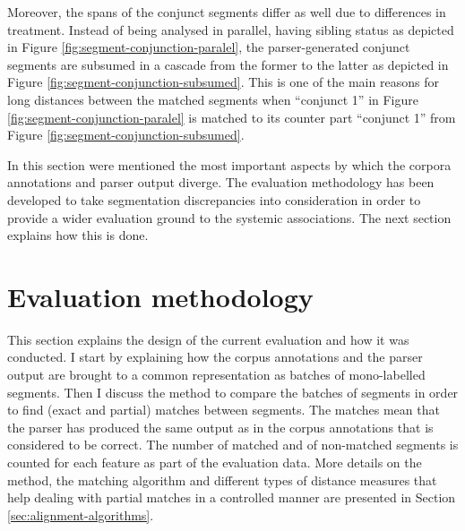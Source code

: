     Moreover, the spans of the conjunct segments differ as well due to differences in treatment. Instead of being analysed in parallel, having sibling status as depicted in Figure \ref{fig:segment-conjunction-paralel}, the parser-generated conjunct segments are subsumed in a cascade from the former to the latter as depicted in Figure \ref{fig:segment-conjunction-subsumed}. This is one of the main reasons for long distances between the matched segments when ``conjunct 1'' in Figure \ref{fig:segment-conjunction-paralel} is matched to its counter part ``conjunct 1'' from Figure \ref{fig:segment-conjunction-subsumed}. 
    
    In this section were mentioned the most important aspects by which the corpora annotations and parser output diverge. The evaluation methodology has been developed to take segmentation discrepancies into consideration in order to provide a wider evaluation ground to the systemic associations. The next section explains how this is done.
    
\section{Evaluation methodology}
\label{sec:evaluation-methodology}
    
    This section explains the design of the current evaluation and how it was conducted. I start by explaining how the corpus annotations and the parser output are brought to a common representation as batches of mono-labelled segments. Then I discuss the method to compare the batches of segments in order to find (exact and partial) matches between segments. The matches mean that the parser has produced the same output as in the corpus annotations that is considered to be correct. The number of matched and of non-matched segments is counted for each feature as part of the evaluation data. More details on the method, the matching algorithm and different types of distance measures that help dealing with partial matches in a controlled manner are presented in Section \ref{sec:alignment-algorithms}.
    

